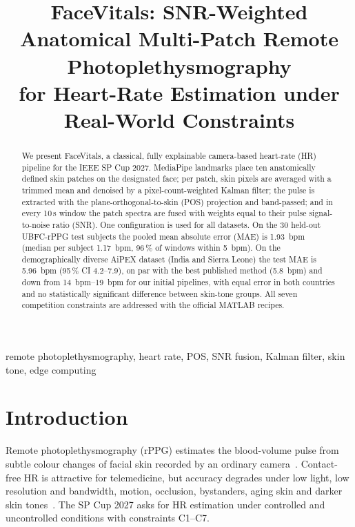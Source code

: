 \documentclass[conference]{IEEEtran}
\begin{document}
\title{FaceVitals: SNR-Weighted Anatomical Multi-Patch Remote Photoplethysmography\\for Heart-Rate Estimation under Real-World Constraints}

\author{
}

\maketitle

\begin{abstract}
We present FaceVitals, a classical, fully explainable camera-based heart-rate (HR) pipeline for the IEEE SP Cup 2027.
MediaPipe landmarks place ten anatomically defined skin patches on the designated face; per patch, skin pixels are
averaged with a trimmed mean and denoised by a pixel-count-weighted Kalman filter; the pulse is extracted with the
plane-orthogonal-to-skin (POS) projection and band-passed; and in every 10\,s window the patch spectra are fused with
weights equal to their pulse signal-to-noise ratio (SNR). One configuration is used for all datasets. On the 30 held-out
UBFC-rPPG test subjects the pooled mean absolute error (MAE) is \SI{1.93}{bpm} (median per subject \SI{1.17}{bpm},
96\,\% of windows within \SI{5}{bpm}). On the demographically diverse AiPEX dataset (India and Sierra Leone) the test MAE
is \SI{5.96}{bpm} (95\,\% CI 4.2--7.9), on par with the best published method (\SI{5.8}{bpm}) and down from
\SIrange{14}{19}{bpm} for our initial pipelines, with equal error in both countries and no statistically significant
difference between skin-tone groups. All seven competition constraints are addressed with the official MATLAB recipes.
\end{abstract}

\begin{IEEEkeywords}
remote photoplethysmography, heart rate, POS, SNR fusion, Kalman filter, skin tone, edge computing
\end{IEEEkeywords}

\section{Introduction}
Remote photoplethysmography (rPPG) estimates the blood-volume pulse from subtle colour changes of facial skin
recorded by an ordinary camera~\cite{dehaan2013chrom,wang2017pos}. Contact-free HR is attractive for telemedicine,
but accuracy degrades under low light, low resolution and bandwidth, motion, occlusion, bystanders, aging skin and
darker skin tones~\cite{dasari2021bias}. The SP Cup 2027 asks for HR estimation under controlled and uncontrolled
conditions with constraints C1--C7.
\end{document}
